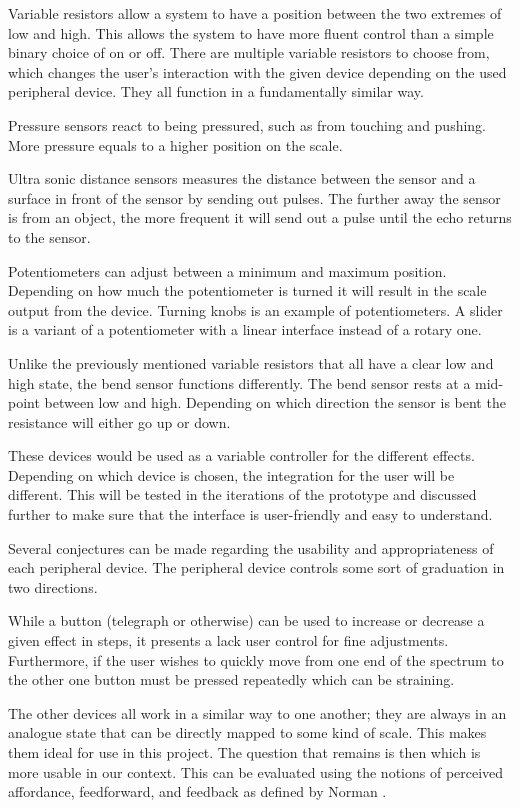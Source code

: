 Variable resistors allow a system to have a position between the two extremes of low and high. This allows the system to have more fluent control than a simple binary choice of on or off. There are multiple variable resistors to choose from, which changes the user's interaction with the given device depending on the used peripheral device.  They all function in a fundamentally similar way. 

Pressure sensors react to being pressured, such as from touching and pushing. More pressure equals to a higher position on the scale.

Ultra sonic distance sensors measures the distance between the sensor and a surface in front of the sensor by sending out pulses. The further away the sensor is from an object, the more frequent it will send out a pulse until the echo returns to the sensor. 

Potentiometers can adjust between a minimum and maximum position. Depending on how much the potentiometer is turned it will result in the scale output from the device. Turning knobs is an example of potentiometers. A slider is a variant of a potentiometer with a linear interface instead of a rotary one.

Unlike the previously mentioned variable resistors that all have a clear low and high state, the bend sensor functions differently. The bend sensor rests at a mid-point between low and high. Depending on which direction the sensor is bent the resistance will either go up or down.

These devices would be used as a variable controller for the different effects. Depending on which device is chosen, the integration for the user will be different. This will be tested in the iterations of the prototype and discussed further to make sure that the interface is user-friendly and easy to understand. 

Several conjectures can be made regarding the usability and appropriateness of each peripheral device. The peripheral device controls some sort of graduation in two directions. 

While a button (telegraph or otherwise) can be used to increase or decrease a given effect in steps, it presents a lack user control for fine adjustments. Furthermore, if the user wishes to quickly move from one end of the spectrum to the other one button must be pressed repeatedly which can be straining.

The other devices all work in a similar way to one another; they are always in an analogue state that can be directly mapped to some kind of scale. This makes them ideal for use in this project. The question that remains is then which is more usable in our context. This can be evaluated using the notions of perceived affordance, feedforward, and feedback as defined by Norman \cite{Norman:1999:ACD:301153.301168}.

